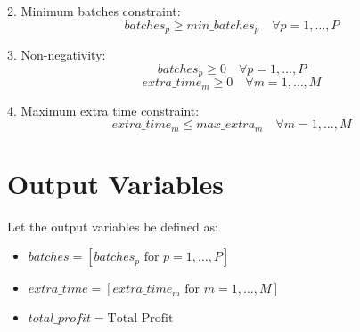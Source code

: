 \documentclass{article}
\begin{document}
2. Minimum batches constraint:
\[
batches_p \geq min\_batches_p \quad \forall p=1,\ldots,P
\]

3. Non-negativity:
\[
batches_p \geq 0 \quad \forall p=1,\ldots,P
\]
\[
extra\_time_m \geq 0 \quad \forall m=1,\ldots,M
\]

4. Maximum extra time constraint:
\[
extra\_time_m \leq max\_extra_m \quad \forall m=1,\ldots,M
\]

\section*{Output Variables}
Let the output variables be defined as:
\begin{itemize}
    \item \(batches = [batches_p \text{ for } p=1, \ldots, P]\)
    \item \(extra\_time = [extra\_time_m \text{ for } m=1, \ldots, M]\)
    \item \(total\_profit = \text{Total Profit}\)
\end{itemize}
\end{document}
